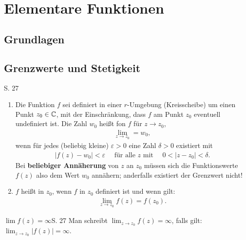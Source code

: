 \section{Elementare Funktionen}



\subsection{Grundlagen}



\subsection{Grenzwerte und Stetigkeit}

\begin{definition}{S. 27}
  \label{def:2_1}
  \begin{enumerate}
    \item Die Funktion $f$ sei definiert in einer $r$-Umgebung (Kreisscheibe) um einen Punkt $z_0 \in \mathbb{C}$, mit der Einschränkung, dass $f$ am Punkt $z_0$ eventuell undefiniert ist.
      Die Zahl $w_0$ heißt  fon $f$ für $z \to z_0$,
      \begin{align}
        \lim_{z \to z_0} = w_0,
      \end{align}
      wenn für jedes (beliebig kleine) $\varepsilon > 0$ eine Zahl $\delta > 0$ existiert mit
      \begin{align}
        \left| f(z) -w_0 \right| < \varepsilon \quad \text{ für alle $z$ mit } \quad 0 < | z - z_0 | < \delta .
      \end{align}
      Bei \textbf{beliebiger Annäherung} von $z$ an $z_0$ müssen sich die Funktionswerte $f(z)$ also dem Wert $w_0$ annähern; anderfalls existiert der Grenzwert nicht!
    \item $f$ heißt  in $z_0$, wenn $f$ in $z_0$ definiert ist und wenn gilt:
      \begin{align}
        \lim_{z \to z_0} f(z) = f(z_0) .
      \end{align}
  \end{enumerate}
\end{definition}

\begin{bemerkung}{$\displaystyle \lim f(z) = \infty$}{S. 27}
  Man schreibt $\displaystyle \lim_{z \to z_0} f(z) = \infty$, falls gilt: $\displaystyle \lim_{z \to z_0} \left| f(z) \right| = \infty$.
\end{bemerkung}



